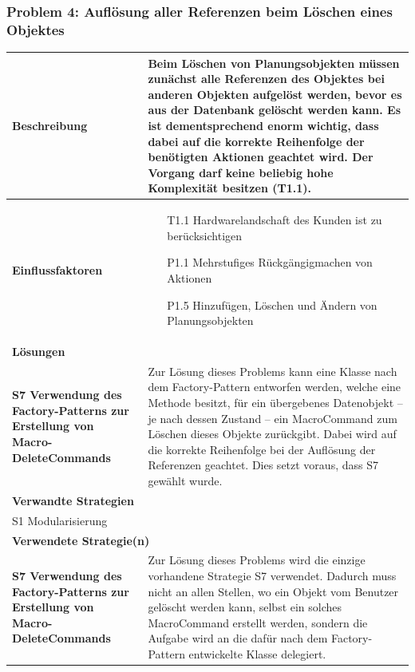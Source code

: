 \documentclass[fontsize=12pt,paper=a4,twoside]{scrartcl}
\begin{document}
\subsubsection{Problem 4: Auflösung aller Referenzen beim Löschen eines Objektes}
\begin{tabularx}{\textwidth}{|p{6cm}|X|}
 \hline
 \textbf{Beschreibung} & 
Beim Löschen von Planungsobjekten müssen zunächst alle Referenzen des Objektes bei anderen Objekten aufgelöst werden, bevor es aus der Datenbank gelöscht werden kann. Es ist dementsprechend enorm wichtig, dass dabei auf die korrekte Reihenfolge der benötigten Aktionen geachtet wird. Der Vorgang darf keine beliebig hohe Komplexität besitzen (T1.1).\\\hline
 \textbf{Einflussfaktoren} &
 \begin{itemize}
\item[T1.1] Hardwarelandschaft des Kunden ist zu berücksichtigen
\item[P1.1] Mehrstufiges Rückgängigmachen von Aktionen
\item[P1.5] Hinzufügen, Löschen und Ändern von Planungsobjekten
 \end{itemize}\\\hline
\multicolumn{2}{|l|}{\textbf{Lösungen}} \\\hline
\textbf{S7 Verwendung des Factory-Patterns zur Erstellung von Macro-DeleteCommands} & Zur Lösung dieses Problems kann eine Klasse nach dem Factory-Pattern entworfen werden, welche eine Methode besitzt, für ein übergebenes Datenobjekt -- je nach dessen Zustand -- ein MacroCommand zum Löschen dieses Objekte zurückgibt. Dabei wird auf die korrekte Reihenfolge bei der Auflösung der Referenzen geachtet. Dies setzt voraus, dass S7 gewählt wurde. \\\hline
 \multicolumn{2}{|l|}{\textbf{Verwandte Strategien}} \\\hline
  \multicolumn{2}{|l|}{S1 Modularisierung} \\\hline
\multicolumn{2}{|l|}{\textbf{Verwendete Strategie(n)}} \\\hline
 \textbf{S7 Verwendung des Factory-Patterns zur Erstellung von Macro-DeleteCommands}   & Zur Lösung dieses Problems wird die einzige vorhandene Strategie S7 verwendet. Dadurch muss nicht an allen Stellen, wo ein Objekt vom Benutzer gelöscht werden kann, selbst ein solches MacroCommand erstellt werden, sondern die Aufgabe wird an die dafür nach dem Factory-Pattern entwickelte Klasse delegiert. \\\hline
\end{tabularx}
\newpage
\end{document}
